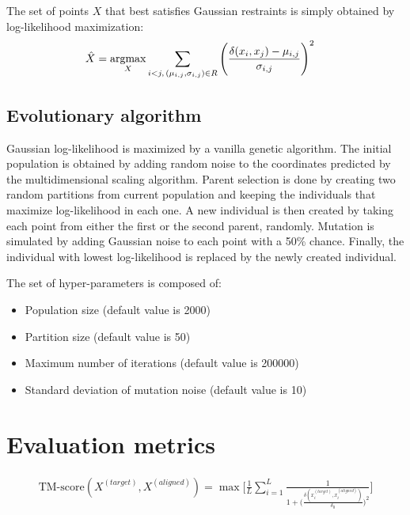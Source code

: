         The set of points $X$ that best satisfies Gaussian restraints is simply
        obtained by log-likelihood maximization:
        \begin{align}
            \hat{X} & = \argmax_{X} \sum\limits_{i < j ,\, (\mu_{i,j}, \sigma_{i,j}) \in R}  %
                \Bigg(\frac{\delta(x_i, x_j) - \mu_{i,j}}{\sigma_{i,j}}\Bigg)^2
        \end{align}

    \subsection{Evolutionary algorithm}

        Gaussian log-likelihood is maximized by a vanilla genetic algorithm.
        The initial population is obtained by adding random noise to the coordinates
        predicted by the multidimensional scaling algorithm.
        Parent selection is done by creating two random partitions from current population
        and keeping the individuals that maximize log-likelihood in each one.
        A new individual is then created by taking each point from either the first
        or the second parent, randomly. Mutation is simulated by adding Gaussian noise
        to each point with a 50\% chance.
        Finally, the individual with lowest log-likelihood is replaced by the
        newly created individual.

        The set of hyper-parameters is composed of:
        \begin{itemize}
            \item Population size (default value is 2000)
            \item Partition size (default value is 50)
            \item Maximum number of iterations (default value is 200000)
            \item Standard deviation of mutation noise (default value is 10)
        \end{itemize}

    \section{Evaluation metrics}

    \begin{align}
        \text{TM-score}(X^{(target)}, X^{(aligned)}) = \max \Bigg[ \frac{1}{L} \sum\limits_{i=1}^L  %
            \frac{1}{1 + \Big(\frac{\delta(x_i^{(target)}, x_i^{(aligned)})}{\delta_0}\Big)^2} \Bigg]
    \end{align}

